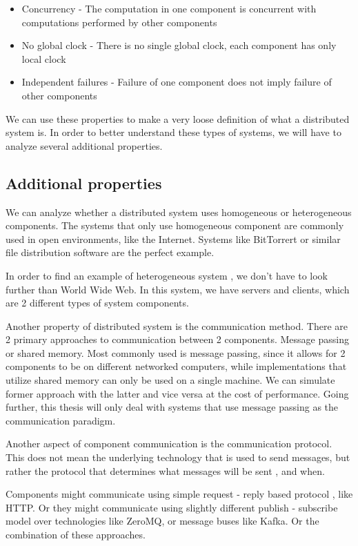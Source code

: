 \begin{itemize}
    \item Concurrency - The computation in one component is concurrent with computations performed by other components
    \item No global clock - There is no single global clock, each component has only local clock
    \item Independent failures - Failure of one component does not imply failure of other components
\end{itemize}

We can use these properties to make a very loose definition of what a distributed system is. In order to better understand these
types of systems, we will have to analyze several additional properties.

\subsection{Additional properties}

We can analyze whether a distributed system uses homogeneous or heterogeneous components.
The systems that only use homogeneous component are commonly used in open
environments, like the Internet. Systems like BitTorrert or similar file distribution software are the perfect example.

In order to find an example of heterogeneous system , we don't have to look further than World Wide Web. In this system,
we have servers and clients, which are 2 different types of system components.

Another property of distributed system is the communication method. There are 2 primary approaches to communication between 2 components. Message passing or shared
memory. Most commonly used is message passing, since it allows for 2 components to be on different networked computers, while implementations that utilize
shared memory can only be used on a single machine. We can simulate former approach with the latter and vice versa at the cost of performance.
Going further, this thesis will only deal with systems that use message passing as the communication paradigm.

Another aspect of component communication is the communication protocol. This does not mean the underlying technology that is used to send
messages, but rather the protocol that determines what messages will be sent , and when.

Components might communicate using simple request - reply based protocol , like HTTP. Or they might communicate using slightly different
publish - subscribe model over technologies like ZeroMQ, or message buses like Kafka. Or the combination of these approaches.

